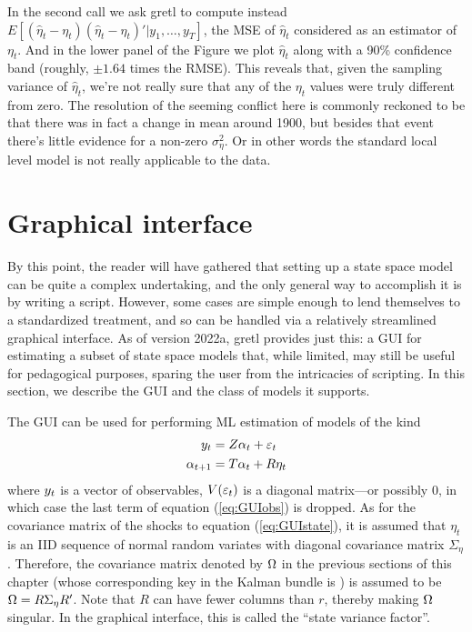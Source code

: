 In the second  call we ask gretl to compute instead
$E[(\hat{\eta}_t-\eta_t)(\hat{\eta}_t-\eta_t)' | y_1,\ldots,y_T]$, the
MSE of $\hat{\eta}_t$ considered as an estimator of $\eta_t$. And in
the lower panel of the Figure we plot $\hat{\eta}_t$ along with a 90\%
confidence band (roughly, $\pm 1.64$ times the RMSE). This reveals
that, given the sampling variance of $\hat{\eta}_t$, we're not really
sure that any of the $\eta_t$ values were truly different from
zero. The resolution of the seeming conflict here is commonly reckoned
to be that there was in fact a change in mean around 1900, but besides
that event there's little evidence for a non-zero
$\sigma^2_{\eta}$. Or in other words the standard local level model is
not really applicable to the data.

\section{Graphical interface}
\label{sec:kalman-gui}
\newcommand{\steta}{\eta}
\newcommand{\strR}{R}

By this point, the reader will have gathered that setting up a state
space model can be quite a complex undertaking, and the only general
way to accomplish it is by writing a script.  However, some cases are
simple enough to lend themselves to a standardized treatment, and so
can be handled via a relatively streamlined graphical interface.  As
of version 2022a, gretl provides just this: a GUI for estimating a
subset of state space models that, while limited, may still be useful
for pedagogical purposes, sparing the user from the intricacies of
scripting.  In this section, we describe the GUI and the class of
models it supports.

The GUI can be used for performing ML estimation of models of the kind
\begin{align}
  \label{eq:GUIobs}
  \obsvec_t & = \obsymat \statevec_{t} + \obsdist_t \\
  \label{eq:GUIstate}
  \statevec_{t+1} & = \statemat \statevec_t + \strR \steta_t
\end{align}
where $y_t$ is a vector of observables, $V(\varepsilon_t)$ is a
diagonal matrix---or possibly 0, in which case the last term of
equation (\ref{eq:GUIobs}) is dropped. As for the covariance matrix of
the shocks to equation (\ref{eq:GUIstate}), it is assumed that
$\steta_t$ is an IID sequence of normal random variates with diagonal
covariance matrix $\Sigma_\steta$. Therefore, the covariance matrix
denoted by $\Omega$ in the previous sections of this chapter (whose
corresponding key in the Kalman bundle is ) is assumed
to be $\statevar = R \Sigma_\steta R'$. Note that $\strR$ can have
fewer columns than $r$, thereby making $\Omega$ singular. In the
graphical interface, this is called the ``state variance factor''.

